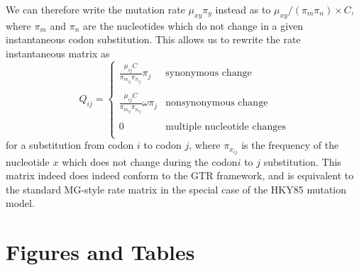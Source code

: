 \documentclass[11pt]{article}
\begin{document}
We can therefore write the mutation rate $\mu_{xy}\pi_y$ instead as to $\mu_{xy} / (\pi_m\pi_n) \times C$, where $\pi_m$ and $\pi_n$ are the nucleotides which do not change in a given instantaneous codon substitution. This allows us to rewrite the rate instantaneous matrix as 
\begin{equation}
Q_{ij} = \left\{ 
\begin{array}{rl}
\frac{\mu_{ij}C}{\pi_{m_{ij}}\pi_{n_{ij}}}\pi_j               &\mbox{synonymous change} \\\\
\frac{\mu_{ij}C}{\pi_{m_{ij}}\pi_{n_{ij}}}\omega\pi_j         &\mbox{nonsynonymous change} \\\\
0                                                     &\mbox{multiple nucleotide changes} \\           
\end{array} \right.
\end{equation} for a substitution from codon $i$ to codon $j$, where $\pi_{x_{ij}}$ is the frequency of the nucleotide $x$ which does not change during the codon$i$ to $j$ substitution. This matrix indeed does indeed conform to the GTR framework, and is equivalent to the standard MG-style rate matrix \cite{MuseGaut1994} in the special case of the HKY85 mutation model.
		
		

		
		


		
		
	
	
\section*{Figures and Tables}

\vspace{2cm}
	
\end{document}
